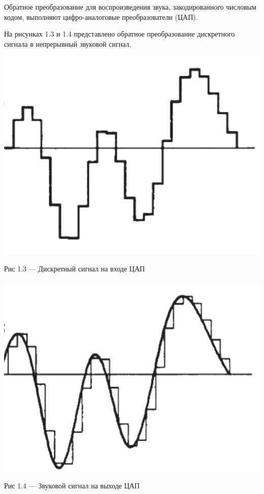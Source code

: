 Обратное преобразование для воспроизведения звука, закодированного числовым кодом, выполняют цифро-аналоговые преобразователи (ЦАП). 

На рисунках 1.3 и 1.4 представлено обратное преобразование дискретного сигнала в непрерывный звуковой сигнал.

\begin{center}
		\includegraphics[scale=0.5]{img/DigitalSignal2.png}
		
			Рис 1.3 — Дискретный сигнал на входе ЦАП
\end{center} 

\newpage

\begin{center}
		\includegraphics[scale=0.5]{img/SoundSignal2.png}
		
			Рис 1.4 — Звуковой сигнал на выходе ЦАП
\end{center} 

